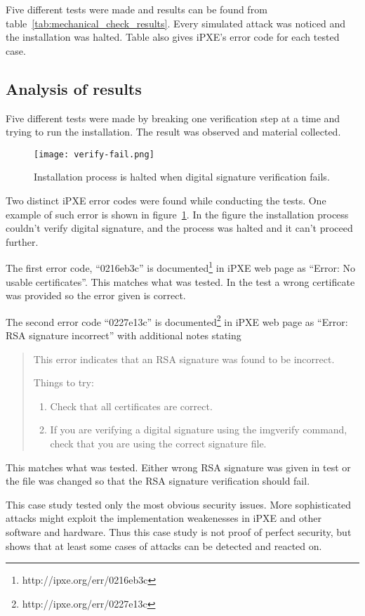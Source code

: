 Five different tests were made and results can be found from
table~\ref{tab:mechanical_check_results}. Every simulated attack was
noticed and the installation was halted. Table also gives iPXE's error
code for each tested case.


\subsection{Analysis of results}

Five different tests were made by breaking one verification step at a
time and trying to run the installation. The result was observed and
material collected.

\begin{figure}[h]
  \texttt{[image: verify-fail.png]}
  \caption{Installation process is halted when digital signature
    verification fails.\label{fig:verify-fail}}
\end{figure}

Two distinct iPXE error codes were found while conducting the
tests. One example of such error is shown in
figure~\ref{fig:verify-fail}. In the figure the installation process
couldn't verify digital signature, and the process was halted and it
can't proceed further.

The first error code, ``0216eb3c'' is
documented\footnote{http://ipxe.org/err/0216eb3c} in iPXE web page as
``Error: No usable certificates''. This matches what was tested. In
the test a wrong certificate was provided so the error given is
correct.

The second error code ``0227e13c'' is
documented\footnote{http://ipxe.org/err/0227e13c} in iPXE web page as
``Error: RSA signature incorrect'' with additional notes stating

\begin{quote}
This error indicates that an RSA signature was found to be incorrect.

Things to try:

\begin{enumerate}
\item Check that all certificates are correct.
\item If you are verifying a digital signature using the imgverify
  command, check that you are using the correct signature file.
\end{enumerate}
\end{quote}

This matches what was tested. Either wrong RSA signature was given in
test or the file was changed so that the RSA signature verification
should fail.

This case study tested only the most obvious security issues. More
sophisticated attacks might exploit the implementation weakenesses in
iPXE and other software and hardware. Thus this case study is not
proof of perfect security, but shows that at least some cases of
attacks can be detected and reacted on.
